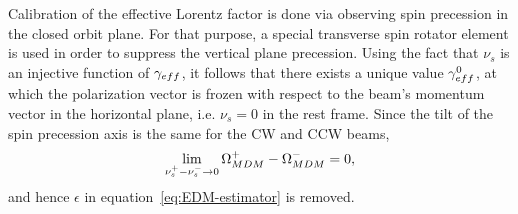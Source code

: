 Calibration of the effective Lorentz factor is done via observing spin precession in the closed orbit plane. For that purpose, a special transverse spin rotator element is used in order to suppress the vertical plane precession.  Using the fact that $\nu_s$ is an injective function of $\gamma_{eff}$, it follows that there exists a unique value $\gamma_{eff}^0$, at which the polarization vector is frozen with respect to the beam's momentum vector in the horizontal plane, i.e. $\nu_s=0$ in the rest frame. Since the tilt of the spin precession axis is the same for the CW and CCW beams,  
\[
\lim_{\nu_s^+ - \nu_s^- \to 0} \Omega_{MDM}^+ - \Omega_{MDM}^- = 0,
\]
and hence $\epsilon$ in equation~\eqref{eq:EDM-estimator} is removed.